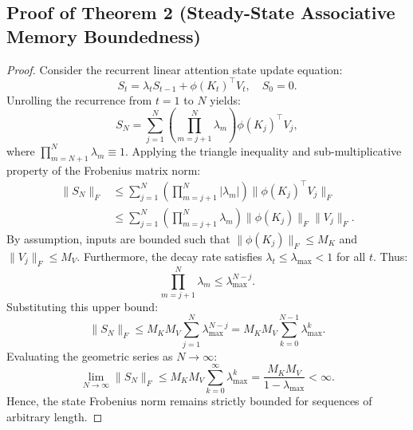 \documentclass[10pt,twocolumn,letterpaper]{article}
\begin{document}
\subsection{Proof of Theorem 2 (Steady-State Associative Memory Boundedness)}
\begin{proof}
Consider the recurrent linear attention state update equation:
\begin{equation}
S_t = \lambda_t S_{t-1} + \phi(K_t)^\top V_t, \quad S_0 = 0.
\end{equation}
Unrolling the recurrence from $t=1$ to $N$ yields:
\begin{equation}
S_N = \sum_{j=1}^N \left( \prod_{m=j+1}^N \lambda_m \right) \phi(K_j)^\top V_j,
\end{equation}
where $\prod_{m=N+1}^N \lambda_m \equiv 1$.
Applying the triangle inequality and sub-multiplicative property of the Frobenius matrix norm:
\begin{align}
\|S_N\|_F &\le \sum_{j=1}^N \left( \prod_{m=j+1}^N |\lambda_m| \right) \|\phi(K_j)^\top V_j\|_F \\
&\le \sum_{j=1}^N \left( \prod_{m=j+1}^N \lambda_m \right) \|\phi(K_j)\|_F \|V_j\|_F.
\end{align}
By assumption, inputs are bounded such that $\|\phi(K_j)\|_F \le M_K$ and $\|V_j\|_F \le M_V$. Furthermore, the decay rate satisfies $\lambda_t \le \lambda_{\max} < 1$ for all $t$. Thus:
\begin{equation}
\prod_{m=j+1}^N \lambda_m \le \lambda_{\max}^{N-j}.
\end{equation}
Substituting this upper bound:
\begin{equation}
\|S_N\|_F \le M_K M_V \sum_{j=1}^N \lambda_{\max}^{N-j} = M_K M_V \sum_{k=0}^{N-1} \lambda_{\max}^k.
\end{equation}
Evaluating the geometric series as $N \to \infty$:
\begin{equation}
\lim_{N \to \infty} \|S_N\|_F \le M_K M_V \sum_{k=0}^\infty \lambda_{\max}^k = \frac{M_K M_V}{1 - \lambda_{\max}} < \infty.
\end{equation}
Hence, the state Frobenius norm remains strictly bounded for sequences of arbitrary length.
\end{proof}
\end{document}

